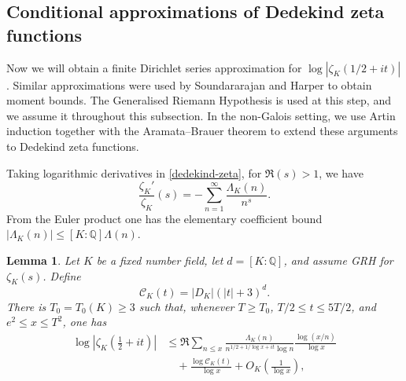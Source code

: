 \documentclass[twoside,reqno,11pt,a4paper]{amsart}
\numberwithin{equation}{section}
\theoremstyle{plain}
\newtheorem{lem}[thm]{Lemma}
\theoremstyle{definition}
\theoremstyle{remark}
\renewcommand{\le}{\leqslant}
\renewcommand{\ge}{\geqslant}
\begin{document}
	\subsection{Conditional approximations of Dedekind zeta functions} Now we will obtain a finite Dirichlet series approximation for $\log|\zeta_K(1/2+it)|$. Similar approximations were used by Soundararajan \cite{Sound} and Harper \cite{Harper} to obtain moment bounds. The Generalised Riemann Hypothesis is used at this step, and we assume it throughout this subsection. In the non-Galois setting, we use Artin induction together with the Aramata--Brauer theorem to extend these arguments to Dedekind zeta functions.
    
	Taking logarithmic derivatives in \eqref{dedekind-zeta},
	for $\Re(s)>1$, we have
	\begin{equation*}
		\frac{\zeta_K'}{\zeta_K}(s)= -\sum_{n=1}^{\infty} \frac{\Lambda_K(n)}{n^s}.
	\end{equation*}
		From the Euler product one has the elementary coefficient bound $|\Lambda_K(n)|\le  [K:\mathbb{Q}]\Lambda(n)$.
\begin{lem}\label{conditional-bound-chandee}
Let $K$ be a fixed number field, let $d=[K:\mathbb Q]$, and assume GRH for $\zeta_K(s)$.  Define
\begin{equation*}
        \mathcal C_K(t)=|D_K|(|t|+3)^d.
\end{equation*}
There is $T_0=T_0(K)\ge3$ such that, whenever $T\ge T_0$, $T/2\le t\le5T/2$, and $e^2\le x\le T^2$, one has
\begin{align*}
\log\left|\zeta_K\left(\frac12+it\right)\right|
&\le
\Re\sum_{n\le x}
\frac{\Lambda_K(n)}
{n^{1/2+1/\log x+it}\log n}
\frac{\log(x/n)}{\log x} \\
&\quad+
\frac{\log\mathcal C_K(t)}{\log x}
+O_K\left(\frac1{\log x}\right),
\end{align*}
\end{lem}
\end{document}
